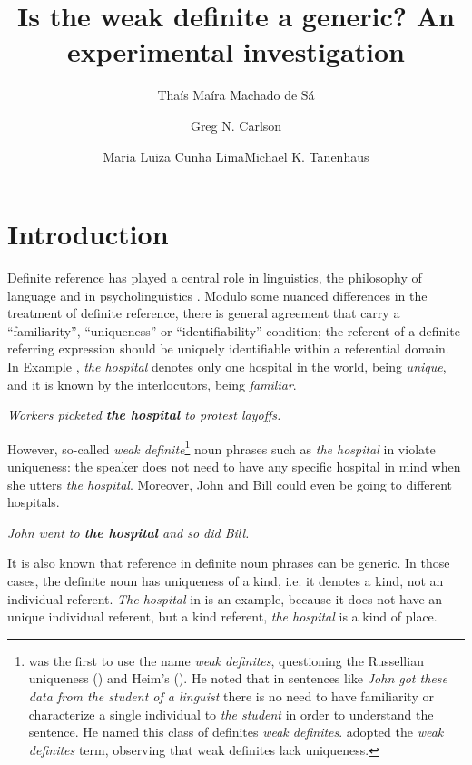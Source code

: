 \documentclass[output=paper,
modfonts
]{langscibook}
\title{Is the weak definite a generic? An experimental investigation}
\author{Thaís Maíra Machado {de Sá}\affiliation{Universidade Federal de Minas Gerais}\and Greg N. Carlson\affiliation{University of Rochester}\and Maria Luiza {Cunha Lima}\affiliation{Universidade Federal de Minas Gerais}\lastand Michael K. Tanenhaus\affiliation{University of Rochester\\Nanjing Normal University}}
\begin{document}
\maketitle

\section{Introduction}\label{sec:desaetal:1}
Definite reference has played a central role in linguistics, the philosophy of language and in psycholinguistics \citep{Russell1905, Strawson1950,Donnellan1966,ClarkMarshall1981,Heim1982,Aguilar-GuevaraZwarts2013}. Modulo some nuanced differences in the treatment of definite reference, there is general agreement that  carry a “familiarity”, “uniqueness” or “identifiability” condition; the referent of a definite referring expression should be uniquely identifiable within a referential domain. In Example , \textit{the hospital} denotes only one hospital in the world, being \textit{unique}, and it is known by the interlocutors, being \textit{familiar}.

\ea \label{ex:desaetal:1} 
\textit{Workers picketed \textbf{the hospital} to protest layoffs.}
\z

However, so-called \textit{weak definite}\footnote{\citet{Poesio1994} was the first to use the name \textit{weak definites}, questioning the Russellian uniqueness (\citeyear{Russell1905}) and Heim’s  (\citeyear{Heim1982}). He noted that in sentences like \textit{John got these data from the student of a linguist} there is no need to have familiarity or characterize a single individual to \textit{the student} in order  to understand the sentence. He named this class of definites \textit{weak definites}. \citet{CarlsonSussman2005} adopted the \textit{weak definites} term, observing that weak definites lack uniqueness.} noun phrases \citep{CarlsonSussman2005} such as \textit{the hospital} in  violate uniqueness: the speaker does not need to have any specific hospital in mind when she utters \textit{the hospital}. Moreover, John and Bill could even be going to different hospitals.

\ea \label{ex:desaetal:2}
\textit{John went to \textbf{the hospital} and so did Bill.}
\z

It is also known that reference in definite noun phrases can be generic. In those cases, the definite noun has uniqueness of a kind, i.e. it denotes a kind, not an individual referent. \textit{The hospital} in  is an example, because it does not have an unique individual referent, but a kind referent, \textit{the hospital} is a kind of place. 
\end{document}
